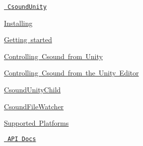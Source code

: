 
\begin{DoxyItemize}
\item \href{/}{\texttt{ Csound\+Unity}}
\begin{DoxyItemize}
\item \mbox{\hyperlink{md_docs_installing}{Installing}}
\item \mbox{\hyperlink{md_docs_getting_started}{Getting started}}
\item \mbox{\hyperlink{md_docs_controlling_csound_from_unity}{Controlling Csound from Unity}}
\item \mbox{\hyperlink{md_docs_controlling_csound_from_the_unity_editor}{Controlling Csound from the Unity Editor}}
\item \mbox{\hyperlink{md_docs_csoundunity_child}{Csound\+Unity\+Child}}
\item \mbox{\hyperlink{md_docs_csound_file_watcher}{Csound\+File\+Watcher}}
\item \mbox{\hyperlink{md_docs_platforms}{Supported Platforms}}
\end{DoxyItemize}
\item \href{http://rorywalsh.github.io/CsoundUnity/html/index.html}{\texttt{ API Docs}} 
\end{DoxyItemize}